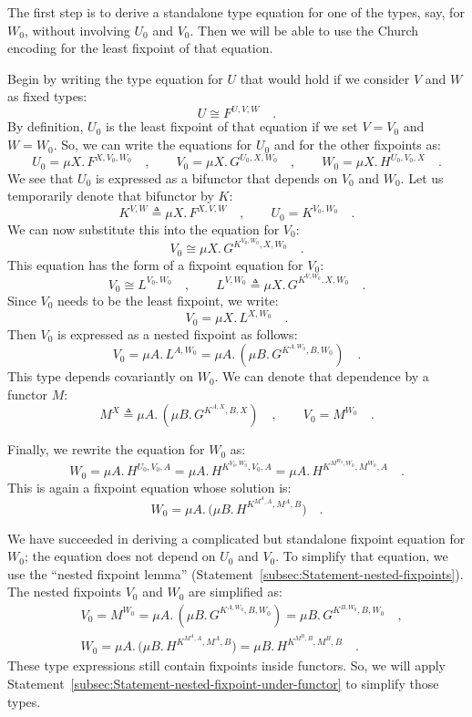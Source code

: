 The first step is to derive a standalone type equation for one of
the types, say, for $W_{0}$, without involving $U_{0}$ and $V_{0}$.
Then we will be able to use the Church encoding for the least fixpoint
of that equation.

Begin by writing the type equation for $U$ that would hold if we
consider $V$ and $W$ as fixed types:
\[
U\cong F^{U,V,W}\quad.
\]
By definition, $U_{0}$ is the least fixpoint of that equation if
we set $V=V_{0}$ and $W=W_{0}$. So, we can write the equations for
$U_{0}$ and for the other fixpoints as:
\[
U_{0}=\mu X.\,F^{X,V_{0},W_{0}}\quad,\quad\quad V_{0}=\mu X.\,G^{U_{0},X,W_{0}}\quad,\quad\quad W_{0}=\mu X.\,H^{U_{0},V_{0},X}\quad.
\]
We see that $U_{0}$ is expressed as a bifunctor that depends on $V_{0}$
and $W_{0}$. Let us temporarily denote that bifunctor by $K$:
\[
K^{V,W}\triangleq\mu X.\,F^{X,V,W}\quad,\quad\quad U_{0}=K^{V_{0},W_{0}}\quad.
\]
We can now substitute this into the equation for $V_{0}$:
\[
V_{0}\cong\mu X.\,G^{K^{V_{0},W_{0}},X,W_{0}}\quad.
\]
This equation has the form of a fixpoint equation for $V_{0}$:
\[
V_{0}\cong L^{V_{0},W_{0}}\quad,\quad\quad L^{V,W_{0}}\triangleq\mu X.\,G^{K^{V,W_{0}},X,W_{0}}\quad.
\]
Since $V_{0}$ needs to be the least fixpoint, we write:
\[
V_{0}=\mu X.\,L^{X,W_{0}}\quad.
\]
Then $V_{0}$ is expressed as a nested fixpoint as follows:
\[
V_{0}=\mu A.\,L^{A,W_{0}}=\mu A.\,(\mu B.\,G^{K^{A,W_{0}},B,W_{0}})\quad.
\]
This type depends covariantly on $W_{0}$. We can denote that dependence
by a functor $M$:
\[
M^{X}\triangleq\mu A.\,(\mu B.\,G^{K^{A,X},B,X})\quad,\quad\quad V_{0}=M^{W_{0}}\quad.
\]

Finally, we rewrite the equation for $W_{0}$ as:
\[
W_{0}=\mu A.\,H^{U_{0},V_{0},A}=\mu A.\,H^{K^{V_{0},W_{0}},V_{0},A}=\mu A.\,H^{K^{M^{W_{0}},W_{0}},M^{W_{0}},A}\quad.
\]
This is again a fixpoint equation whose solution is:
\[
W_{0}=\mu A.\,\big(\mu B.\,H^{K^{M^{A},A},M^{A},B}\big)\quad.
\]

We have succeeded in deriving a complicated but standalone fixpoint
equation for $W_{0}$; the equation does not depend on $U_{0}$ and
$V_{0}$. To simplify that equation, we use the \textsf{``}nested fixpoint
lemma\textsf{''} (Statement~\ref{subsec:Statement-nested-fixpoints}). The
nested fixpoints $V_{0}$ and $W_{0}$ are simplified as:
\begin{align*}
 & V_{0}=M^{W_{0}}=\mu A.\,(\mu B.\,G^{K^{A,W_{0}},B,W_{0}})=\mu B.\,G^{K^{B,W_{0}},B,W_{0}}\quad,\\
 & W_{0}=\mu A.\,\big(\mu B.\,H^{K^{M^{A},A},M^{A},B}\big)=\mu B.\,H^{K^{M^{B},B},M^{B},B}\quad.
\end{align*}
These type expressions still contain fixpoints inside functors. So,
we will apply Statement~\ref{subsec:Statement-nested-fixpoint-under-functor}
to simplify those types.

